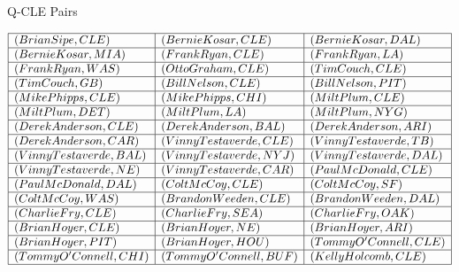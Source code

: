\documentclass{ximera}
\begin{document}
Q-CLE Pairs
\begin{center}
\[
\begin{array}{|l|l|l|}
\hline

(Brian Sipe, CLE) &  (Bernie Kosar, CLE) & (Bernie Kosar, DAL) \\\hline 


(Bernie Kosar, MIA) & (Frank Ryan, CLE) & (Frank Ryan, LA) \\\hline 


(Frank Ryan, WAS) & (Otto Graham, CLE) & (Tim Couch, CLE) \\\hline 


(Tim Couch, GB) & (Bill Nelson, CLE) & (Bill Nelson, PIT) \\\hline


(Mike Phipps, CLE) & (Mike Phipps, CHI) & (Milt Plum, CLE) \\\hline


(Milt Plum, DET) & (Milt Plum, LA) & (Milt Plum, NYG) \\\hline


(Derek Anderson, CLE) & (Derek Anderson, BAL) & (Derek Anderson, ARI) \\\hline


(Derek Anderson, CAR) & (Vinny Testaverde, CLE) & (Vinny Testaverde, TB) \\\hline


(Vinny Testaverde, BAL) & (Vinny Testaverde, NYJ) & (Vinny Testaverde, DAL) \\\hline 


(Vinny Testaverde, NE) & (Vinny Testaverde, CAR) & (Paul McDonald, CLE) \\\hline 


(Paul McDonald, DAL) & (Colt McCoy, CLE) & (Colt McCoy, SF) \\\hline 


(Colt McCoy, WAS) & (Brandon Weeden, CLE) & (Brandon Weeden, DAL) \\\hline 


(Charlie Fry, CLE) & (Charlie Fry, SEA) & (Charlie Fry, OAK) \\\hline 


(Brian Hoyer, CLE) & (Brian Hoyer, NE) & (Brian Hoyer, ARI) \\\hline 


(Brian Hoyer, PIT) & (Brian Hoyer, HOU) & (Tommy O'Connell, CLE) \\\hline 


(Tommy O'Connell, CHI) & (Tommy O'Connell, BUF) & (Kelly Holcomb, CLE) \\\hline 



\end{array}\]
\end{center}
\end{document}
